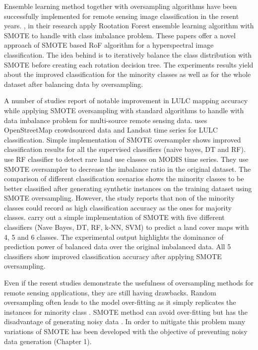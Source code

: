 \documentclass[parskip=full]{scrartcl}
\begin{document}
Ensemble learning method together with oversampling algorithms have been
successfully implemented for remote sensing image classification in the resent 
years. \cite{Feng2018}, \cite{Feng2019} in their research apply Rootation 
Forest ensemble learning algorithm with SMOTE to handle with class imbalance 
problem. These papers offer a novel approach of SMOTE based RoF algorithm 
for a hyperspectral image classification. The idea behind is to iteratively 
balance the class distribution with SMOTE before creating each rotation 
decision tree. The experiments results yield about the improved classification 
for the minority classes as well as for the whole dataset after balancing data 
by oversampling.

A number of studies report of notable improvement in LULC mapping accuracy 
while applying SMOTE oversampling with standard algorithms to handle with data 
imbalance problem for multi-source remote sensing data. \cite{Johnson2016}  
uses OpenStreetMap crowdsourced data and Landsat time series for LULC 
classification. Simple implementation of SMOTE oversampler shows improved 
classification results for all the supervised classifiers (naive bayes, DT and 
RF). \cite{Bogner2018} use RF classifier to detect rare land use classes on 
MODIS time series. They use SMOTE oversampler to decrease the imbalance ratio 
in the original dataset. The comparison of different classification scenarios 
shows the minority classes to be better classified after generating synthetic 
instances on the training dataset using SMOTE oversampling. However, the study 
reports that non of the minority classes could record as high classification 
accuracy as the ones for majority classes. \cite{Panda2018} carry out a simple 
implementation of SMOTE with five different classifiers (Nave Bayes, DT, RF, 
k-NN, SVM) to predict a land cover maps with 4, 5 and 6 classes. The 
experimental output highlights the dominance of prediction power of balanced 
data over the original imbalanced data. All 5 classifiers show improved 
classification accuracy after applying SMOTE oversampling. 

Even if the resent studies demonstrate the usefulness of oversampling methods 
for remote sensing applications, they are still having drawbacks. Random 
oversampling often leads to the model over-fitting as it simply replicates the 
instances for minority class \cite{Feng2019}. SMOTE method can avoid 
over-fitting but has the disadvantage of generating noisy data \cite{He2008}. 
In order to mitigate this problem many variations of SMOTE has been developed 
with the objective of preventing noisy data generation (Chapter 1).
\end{document}

